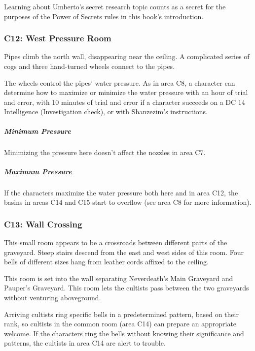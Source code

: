 \documentclass[10pt,a4paper,twoside,bg=print,twocolumn,openany,nodeprecatedcode]{dndbook}
\begin{document}
Learning about Umberto's secret research topic counts as a secret for the purposes of the Power of Secrets rules in this book's introduction.

\subsubsection{C12: West Pressure Room}
\begin{DndReadAloud}{}
Pipes climb the north wall, disappearing near the ceiling. A complicated series of cogs and three hand-turned wheels connect to the pipes.

\end{DndReadAloud}

The wheels control the pipes' water pressure. As in area C8, a character can determine how to maximize or minimize the water pressure with an hour of trial and error, with 10 minutes of trial and error if a character succeeds on a DC 14 Intelligence (Investigation check), or with Shanzezim's instructions.

\subparagraph{Minimum Pressure}
Minimizing the pressure here doesn't affect the nozzles in area C7.

\subparagraph{Maximum Pressure}
If the characters maximize the water pressure both here and in area C12, the basins in areas C14 and C15 start to overflow (see area C8 for more information).

\subsubsection{C13: Wall Crossing}
\begin{DndReadAloud}{}
This small room appears to be a crossroads between different parts of the graveyard. Steep stairs descend from the east and west sides of this room. Four bells of different sizes hang from leather cords affixed to the ceiling.

\end{DndReadAloud}

This room is set into the wall separating Neverdeath's Main Graveyard and Pauper's Graveyard. This room lets the cultists pass between the two graveyards without venturing aboveground.

Arriving cultists ring specific bells in a predetermined pattern, based on their rank, so cultists in the common room (area C14) can prepare an appropriate welcome. If the characters ring the bells without knowing their significance and patterns, the cultists in area C14 are alert to trouble.
\end{document}
